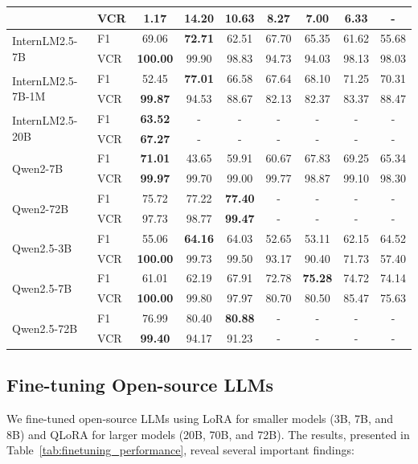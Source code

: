 \documentclass[conference]{IEEEtran}
\begin{document}
\begin{table}[htbp]
{\begin{tabular}{l|l|ccccccc}
                            & VCR & 1.17 & \textbf{14.20} & 10.63 & 8.27 & 7.00 & 6.33 & - \\
\hline
\multirow{2}{*}{InternLM2.5-7B} & F1 & 69.06 & \textbf{72.71} & 62.51 & 67.70 & 65.35 & 61.62 & 55.68 \\
                                & VCR & \textbf{100.00} & 99.90 & 98.83 & 94.73 & 94.03 & 98.13 & 98.03 \\
\hline
\multirow{2}{*}{InternLM2.5-7B-1M} & F1 & 52.45 & \textbf{77.01} & 66.58 & 67.64 & 68.10 & 71.25 & 70.31 \\
                                   & VCR & \textbf{99.87} & 94.53 & 88.67 & 82.13 & 82.37 & 83.37 & 88.47 \\
\hline
\multirow{2}{*}{InternLM2.5-20B} & F1 & \textbf{63.52} & - & - & - & - & - & - \\
                                 & VCR & \textbf{67.27} & - & - & - & - & - & - \\
\hline
\multirow{2}{*}{Qwen2-7B} & F1 & \textbf{71.01} & 43.65 & 59.91 & 60.67 & 67.83 & 69.25 & 65.34 \\
                              & VCR & \textbf{99.97} & 99.70 & 99.00 & 99.77 & 98.87 & 99.10 & 98.30 \\
\hline
\multirow{2}{*}{Qwen2-72B} & F1 & 75.72 & 77.22 & \textbf{77.40} & - & - & - & - \\
                               & VCR & 97.73 & 98.77 & \textbf{99.47} & - & - & - & - \\
\hline
\multirow{2}{*}{Qwen2.5-3B} & F1 & 55.06 & \textbf{64.16} & 64.03 & 52.65 & 53.11 & 62.15 & 64.52 \\
                            & VCR & \textbf{100.00} & 99.73 & 99.50 & 93.17 & 90.40 & 71.73 & 57.40 \\
\hline
\multirow{2}{*}{Qwen2.5-7B} & F1 & 61.01 & 62.19 & 67.91 & 72.78 & \textbf{75.28} & 74.72 & 74.14 \\
                            & VCR & \textbf{100.00} & 99.80 & 97.97 & 80.70 & 80.50 & 85.47 & 75.63 \\
\hline
\multirow{2}{*}{Qwen2.5-72B} & F1 & 76.99 & 80.40 & \textbf{80.88} & - & - & - & - \\
                             & VCR & \textbf{99.40} & 94.17 & 91.23 & - & - & - & - \\
\hline
\end{tabular}
}
\label{tab:performance}
\end{table}

\subsection{Fine-tuning Open-source LLMs}
We fine-tuned open-source LLMs using LoRA for smaller models (3B, 7B, and 8B) and QLoRA for larger models (20B, 70B, and 72B). The results, presented in Table~\ref{tab:finetuning_performance}, reveal several important findings:
\end{document}
